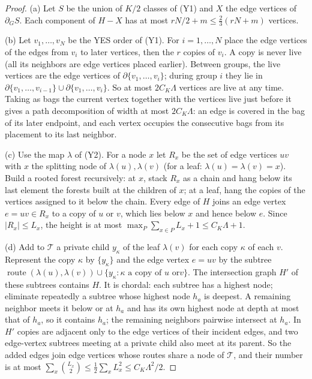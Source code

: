 \documentclass[11pt,letterpaper]{article}
\theoremstyle{definition}
\theoremstyle{remark}
\newcommand{\Tr}{\mathcal T}
\DeclareMathOperator{\route}{route}
\begin{document}
\begin{proof}
(a) Let \(S\) be the union of \(K/2\) classes of (Y1) and \(X\) the edge
vertices of \(\partial_GS\). Each component of \(H-X\) has at most
\(rN/2+m\le\frac23(rN+m)\) vertices.

(b) Let \(v_1,\dots,v_N\) be the YES order of (Y1). For \(i=1,\dots,N\)
place the edge vertices of the edges from \(v_i\) to later vertices, then
the \(r\) copies of \(v_i\). A copy is never live (all its neighbors are
edge vertices placed earlier). Between groups, the live vertices are the
edge vertices of \(\partial\{v_1,\dots,v_i\}\); during group \(i\) they lie
in \(\partial\{v_1,\dots,v_{i-1}\}\cup\partial\{v_1,\dots,v_i\}\). So at
most \(2C_K\Lambda\) vertices are live at any time. Taking as bags the
current vertex together with the vertices live just before it gives a path
decomposition of width at most \(2C_K\Lambda\): an edge is covered in the bag
of its later endpoint, and each vertex occupies the consecutive bags from its
placement to its last neighbor.

(c) Use the map \(\lambda\) of (Y2). For a node \(x\) let \(R_x\) be the set
of edge vertices \(uv\) with \(x\) the splitting node of
\(\lambda(u),\lambda(v)\) (for a leaf: \(\lambda(u)=\lambda(v)=x\)). Build a
rooted forest recursively: at \(x\), stack \(R_x\) as a chain and hang
below its last element the forests built at the children of \(x\); at a
leaf, hang the copies of the vertices assigned to it below the chain. Every
edge of \(H\) joins an edge vertex \(e=uv\in R_x\) to a copy of \(u\) or
\(v\), which lies below \(x\) and hence below \(e\). Since \(|R_x|\le L_x\),
the height is at most \(\max_P\sum_{x\in P}L_x+1\le C_K\Lambda+1\).

(d) Add to \(\Tr\) a private child \(y_\kappa\) of the leaf \(\lambda(v)\)
for each copy \(\kappa\) of each \(v\). Represent the copy \(\kappa\) by
\(\{y_\kappa\}\) and the edge vertex \(e=uv\) by the subtree
\(\route(\lambda(u),\lambda(v))\cup\{y_\kappa:\kappa\text{ a copy of }u\text{ or
}v\}\). The intersection graph \(H'\) of these subtrees contains \(H\). It is
chordal: each subtree has a highest node; eliminate repeatedly a subtree
whose highest node \(h_a\) is deepest. A remaining neighbor meets it below
or at \(h_a\) and has its own highest node at depth at most that of \(h_a\),
so it contains \(h_a\); the remaining neighbors pairwise intersect at
\(h_a\). In \(H'\) copies are adjacent only to the edge vertices of their
incident edges, and two edge-vertex subtrees meeting at a private child also
meet at its parent. So the added edges join edge vertices whose routes share
a node of \(\Tr\), and their number is at most
\(\sum_x\binom{L_x}2\le\frac12\sum_xL_x^2\le C_K\Lambda^2/2\).
\end{proof}
\end{document}
